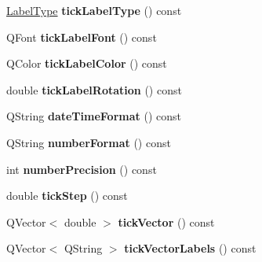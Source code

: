\begin{DoxyCompactItemize}
\item 
\hypertarget{classQCPAxis_a8a6f58a1ce12cfc4fadd379167668e8d}{\hyperlink{classQCPAxis_a4a7da0166f755f5abac23b765d184cad}{Label\-Type} {\bfseries tick\-Label\-Type} () const }\label{classQCPAxis_a8a6f58a1ce12cfc4fadd379167668e8d}

\item 
\hypertarget{classQCPAxis_af6d7ad17f3398b114a413f7a3dc5ef9d}{Q\-Font {\bfseries tick\-Label\-Font} () const }\label{classQCPAxis_af6d7ad17f3398b114a413f7a3dc5ef9d}

\item 
\hypertarget{classQCPAxis_ac86d0636aa55ddd94df171f609897a32}{Q\-Color {\bfseries tick\-Label\-Color} () const }\label{classQCPAxis_ac86d0636aa55ddd94df171f609897a32}

\item 
\hypertarget{classQCPAxis_ab9199d72b8c4c06cc6c9b928c30d00d2}{double {\bfseries tick\-Label\-Rotation} () const }\label{classQCPAxis_ab9199d72b8c4c06cc6c9b928c30d00d2}

\item 
\hypertarget{classQCPAxis_a132b54ae184a12ed24c9af24f53dc70b}{Q\-String {\bfseries date\-Time\-Format} () const }\label{classQCPAxis_a132b54ae184a12ed24c9af24f53dc70b}

\item 
\hypertarget{classQCPAxis_ae6729b40845b29ffa5a440aa53cec215}{Q\-String {\bfseries number\-Format} () const }\label{classQCPAxis_ae6729b40845b29ffa5a440aa53cec215}

\item 
\hypertarget{classQCPAxis_a91cb2825060ac79a889296377fe0c7c1}{int {\bfseries number\-Precision} () const }\label{classQCPAxis_a91cb2825060ac79a889296377fe0c7c1}

\item 
\hypertarget{classQCPAxis_a0e6120d24266544441ab691f316a1b03}{double {\bfseries tick\-Step} () const }\label{classQCPAxis_a0e6120d24266544441ab691f316a1b03}

\item 
\hypertarget{classQCPAxis_a5b00b14f480f926df976cc6c52309e78}{Q\-Vector$<$ double $>$ {\bfseries tick\-Vector} () const }\label{classQCPAxis_a5b00b14f480f926df976cc6c52309e78}

\item 
\hypertarget{classQCPAxis_a64e6fa81f943ad33dcaf3fa606687b93}{Q\-Vector$<$ Q\-String $>$ {\bfseries tick\-Vector\-Labels} () const }\label{classQCPAxis_a64e6fa81f943ad33dcaf3fa606687b93}


\end{DoxyCompactItemize}
